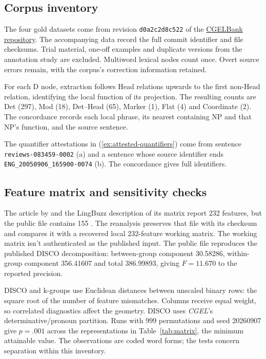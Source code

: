 \documentclass[12pt]{article}
\begin{document}
\subsection{Corpus inventory}

The four gold datasets come from revision \texttt{d0a2c2d8c522} of the \href{https://github.com/nert-nlp/cgel}{CGELBank repository}. The accompanying data record the full commit identifier and file checksums. Trial material, one-off examples and duplicate versions from the annotation study are excluded. Multiword lexical nodes count once. Overt source errors remain, with the corpus's correction information retained.

For each D node, extraction follows Head relations upwards to the first non-Head relation, identifying the local function of its projection. The resulting counts are Det (297), Mod (18), Det--Head (65), Marker (1), Flat (4) and Coordinate (2). The concordance records each local phrase, its nearest containing NP and that NP's function, and the source sentence.

The quantifier attestations in (\ref{ex:attested-quantifiers}) come from sentence \nolinkurl{reviews-083459-0002} (a) and a sentence whose source identifier ends \nolinkurl{ENG_20050906_165900-0074} (b). The concordance gives full identifiers.

\subsection{Feature matrix and sensitivity checks}

The article by \textcite{reynolds2021} and the LingBuzz description of its matrix report 232 features, but the public file contains 155 \citep{reynolds2021matrixpublic}. The reanalysis preserves that file with its checksum and compares it with a recovered local 232-feature working matrix. The working matrix isn't authenticated as the published input. The public file reproduces the published DISCO decomposition: between-group component 30.58286, within-group component 356.41607 and total 386.99893, giving $F=11.670$ to the reported precision.

DISCO and k-groups use Euclidean distances between unscaled binary rows: the square root of the number of feature mismatches. Columns receive equal weight, so correlated diagnostics affect the geometry. DISCO uses \textit{CGEL}'s determinative/pronoun partition. Runs with 999 permutations and seed 20260907 give $p=.001$ across the representations in Table~\ref{tab:matrix}, the minimum attainable value. The observations are coded word forms; the tests concern separation within this inventory.
\end{document}
